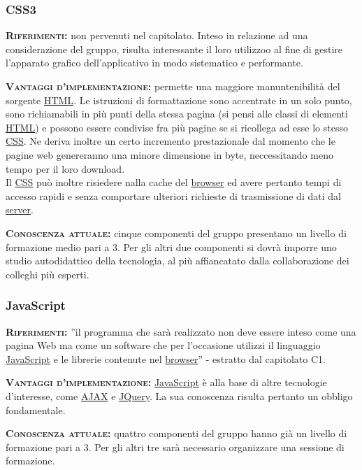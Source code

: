 \subsubsection{CSS3}
\begin{description}
	\item{\scshape\bfseries Riferimenti:} non pervenuti nel capitolato. Inteso in relazione ad una considerazione del gruppo, risulta interessante il loro utilizzoo al fine di gestire l'apparato grafico dell'applicativo in modo sistematico e performante.
	
\item{\scshape\bfseries Vantaggi d'implementazione:} permette una maggiore manuntenibilità del sorgente \underline{HTML}. Le istruzioni di formattazione sono accentrate in un solo punto, sono richiamabili in più punti della stessa pagina (si pensi alle classi di elementi \underline{HTML}) e possono essere condivise fra più pagine se si ricollega ad esse lo stesso \underline{CSS}\@. Ne deriva inoltre un certo incremento prestazionale dal momento che le pagine web genereranno una minore dimensione in byte, neccessitando meno tempo per il loro download. \\Il \underline{CSS} può inoltre risiedere nalla cache del \underline{browser} ed avere pertanto tempi di accesso rapidi e senza comportare ulteriori richieste di trasmissione di dati dal \underline{server}.
	
	\item{\scshape\bfseries Conoscenza attuale:} cinque componenti del gruppo presentano un livello di formazione medio pari a 3. Per gli altri due componenti si dovrà imporre uno studio autodidattico della tecnologia, al più affiancatato dalla collaborazione dei colleghi più esperti.
\end{description}

\subsubsection{JavaScript}
\begin{description} 
	\item{\scshape\bfseries Riferimenti:}
  ''il programma che sarà realizzato non deve essere inteso come una pagina Web ma come un software che per l'occasione utilizzi il linguaggio \underline{JavaScript} e le librerie contenute nel \underline{browser}'' - estratto dal capitolato C1.

	\item{\scshape\bfseries Vantaggi d'implementazione:} \underline{JavaScript} è alla base di altre tecnologie d'interesse, come \underline{AJAX} e \underline{JQuery}. La sua conoscenza risulta pertanto un obbligo fondamentale.

	\item{\scshape\bfseries Conoscenza attuale:} quattro componenti del gruppo hanno già un livello di formazione pari a 3. Per gli altri tre sarà necessario organizzare una sessione di formazione.
\end{description}

